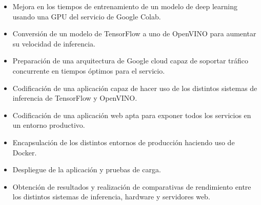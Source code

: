 \begin{itemize}
    \item Mejora en los tiempos de entrenamiento de un modelo de deep learning usando una GPU del servicio de Google Colab.
    \item Conversión de un modelo de TensorFlow a uno de OpenVINO para aumentar su velocidad de inferencia.
    \item Preparación de una arquitectura de Google cloud capaz de soportar tráfico concurrente en tiempos óptimos para el servicio.
    \item Codificación de una aplicación capaz de hacer uso de los distintos sistemas de inferencia de TensorFlow y OpenVINO.
    \item Codificación de una aplicación web apta para exponer todos los servicios en un entorno productivo.
    \item Encapsulación de los distintos entornos de producción haciendo uso de Docker.
    \item Despliegue de la aplicación y pruebas de carga.
    \item Obtención de resultados y realización de comparativas de rendimiento entre los distintos sistemas de inferencia, hardware y servidores web.
\end{itemize}


